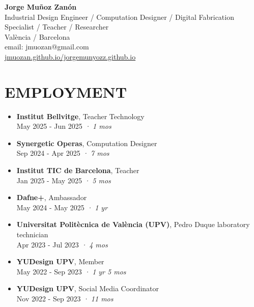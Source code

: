 \documentclass[11pt,a4paper]{article}
\begin{document}
\begin{center}
\textbf{\Large Jorge Muñoz Zanón}\\
\vspace{0.1cm}
Industrial Design Engineer / Computation Designer / Digital Fabrication Specialist / Teacher / Researcher\\
València / Barcelona\\
email: jmuozan@gmail.com\\
\href{https://jmuozan.github.io/jorgemunyozz.github.io/}{jmuozan.github.io/jorgemunyozz.github.io}
\end{center}

\section*{EMPLOYMENT}
\begin{itemize}[leftmargin=*,label={},itemsep=6pt]
    \item \textbf{Institut Bellvitge}, Teacher Technology\\
    May 2025 - Jun 2025 \textit{· 1 mos}

    \item \textbf{Synergetic Operas}, Computation Designer\\
    Sep 2024 - Apr 2025 \textit{· 7 mos}
    
    \item \textbf{Institut TIC de Barcelona}, Teacher\\
    Jan 2025 - May 2025 \textit{· 5 mos}
    
    \item \textbf{Dafne+}, Ambassador\\
    May 2024 - May 2025 \textit{· 1 yr}
    
    \item \textbf{Universitat Politècnica de València (UPV)}, Pedro Duque laboratory technician\\
    Apr 2023 - Jul 2023 \textit{· 4 mos}
    
    \item \textbf{YUDesign UPV}, Member\\
    May 2022 - Sep 2023 \textit{· 1 yr 5 mos}
    
    \item \textbf{YUDesign UPV}, Social Media Coordinator\\
    Nov 2022 - Sep 2023 \textit{· 11 mos}
\end{itemize}
\end{document}
